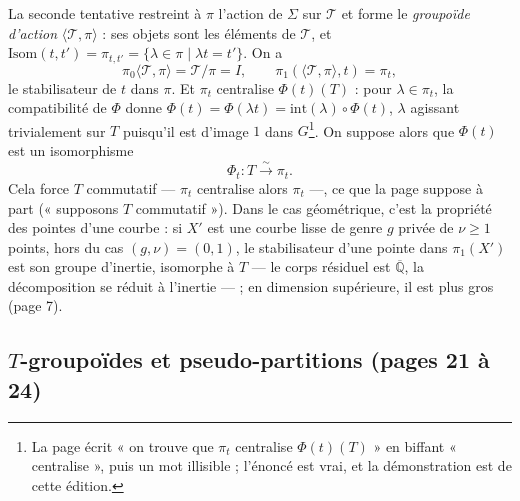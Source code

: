\documentclass[11pt,a4paper]{article}
\begin{document}
La seconde tentative restreint à $\pi$ l'action de $\Sigma$ sur $\mathcal{T}$
et forme le \emph{groupoïde d'action} $\langle \mathcal{T}, \pi\rangle$ : ses
objets sont les éléments de $\mathcal{T}$, et $\mathrm{Isom}(t, t') =
\pi_{t,t'} = \{\lambda \in \pi \mid \lambda t = t'\}$. On a
\[
\pi_0\langle \mathcal{T}, \pi\rangle = \mathcal{T}/\pi = I, \qquad
\pi_1(\langle \mathcal{T}, \pi\rangle, t) = \pi_t,
\]
le stabilisateur de $t$ dans $\pi$. Et $\pi_t$ centralise $\Phi(t)(T)$ : pour
$\lambda \in \pi_t$, la compatibilité de $\Phi$ donne $\Phi(t) = \Phi(\lambda
t) = \mathrm{int}(\lambda) \circ \Phi(t)$, $\lambda$ agissant trivialement sur
$T$ puisqu'il est d'image $1$ dans $G$\footnote{La page écrit « on trouve que
$\pi_t$ centralise $\Phi(t)(T)$ » en biffant « centralise », puis un mot
illisible ; l'énoncé est vrai, et la démonstration est de cette édition.}. On
suppose alors que $\Phi(t)$ est un isomorphisme
\[
\Phi_t : T \xrightarrow{\ \sim\ } \pi_t .
\]
Cela force $T$ commutatif — $\pi_t$ centralise alors $\pi_t$ —, ce que la page
suppose à part (« supposons $T$ commutatif »). Dans le cas géométrique, c'est
la propriété des pointes d'une courbe : si $X'$ est une courbe lisse de genre
$g$ privée de $\nu \geq 1$ points, hors du cas $(g, \nu) = (0, 1)$, le
stabilisateur d'une pointe dans $\pi_1(X')$ est son groupe d'inertie, isomorphe
à $T$ — le corps résiduel est $\overline{\mathbb{Q}}$, la décomposition se
réduit à l'inertie — ; en dimension supérieure, il est plus gros (page 7).

\subsection*{$T$-groupoïdes et pseudo-partitions (pages 21 à 24)}
\end{document}
